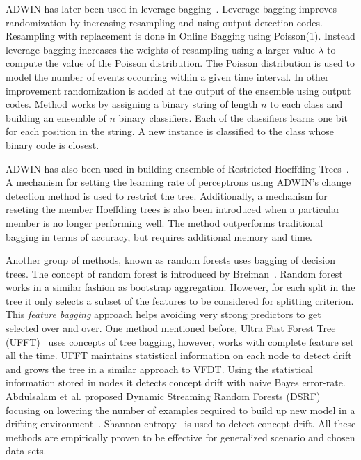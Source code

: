 ADWIN has later been used in leverage bagging~\cite{bifet10:levbag}. Leverage bagging improves randomization by increasing resampling and using output detection codes. Resampling with replacement is done in Online Bagging using Poisson(1). Instead leverage bagging increases the weights of resampling using a larger value $\lambda$ to compute the value of the Poisson distribution. The Poisson distribution is used to model the number of events occurring within a given time interval. In other improvement randomization is added at the output of the ensemble using output codes. Method works by assigning a binary string of length $n$ to each class and building an ensemble of $n$ binary classifiers. Each of the classifiers learns one bit for each position in the string. A new instance is classified to the class whose binary code is closest. 

ADWIN has also been used in building ensemble of Restricted Hoeffding Trees~\cite{bifet10:rht}. A mechanism for setting the learning rate of perceptrons using ADWIN's change detection method is used to restrict the tree. Additionally, a mechanism for reseting the member Hoeffding trees is also been introduced when a particular member is no longer performing well. The method outperforms traditional bagging in terms of accuracy, but requires additional memory and time.

Another group of methods, known as random forests uses bagging of decision trees. The concept of random forest is introduced by Breiman~\cite{breiman99:randomforest}. Random forest works in a similar fashion as bootstrap aggregation. However, for each split in the tree it only selects a subset of the features to be considered for splitting criterion. This \textit{feature bagging} approach helps avoiding very strong predictors to get selected over and over. One method mentioned before, Ultra Fast Forest Tree (UFFT)~\cite{gama04:ft, gama05:ft} uses concepts of tree bagging, however, works with complete feature set all the time. UFFT maintains statistical information on each node to detect drift and grows the tree in a similar  approach to VFDT. Using the statistical information stored in nodes it detects concept drift with naive Bayes error-rate. Abdulsalam et al. proposed Dynamic Streaming Random Forests (DSRF) focusing on lowering the number of examples required to build up new model in a drifting environment~\cite{salam08:dsrf, salam11:dsrf}. Shannon entropy~\cite{shannon01:entropy} is used to detect concept drift. All these methods are empirically proven to be effective for generalized scenario and chosen data sets. 

